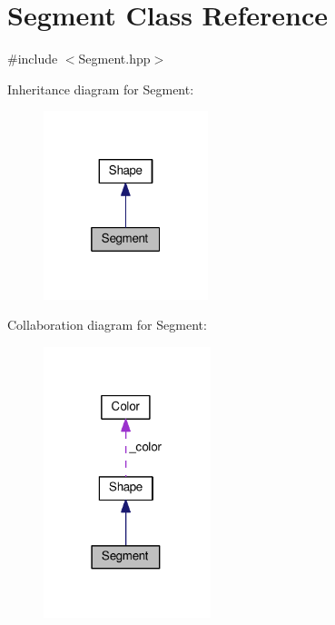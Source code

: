 \hypertarget{class_segment}{}\section{Segment Class Reference}
\label{class_segment}


{\ttfamily \#include $<$Segment.\+hpp$>$}



Inheritance diagram for Segment\+:\nopagebreak
\begin{figure}[H]
\begin{center}
\leavevmode
\includegraphics[width=136pt]{class_segment__inherit__graph}
\end{center}
\end{figure}


Collaboration diagram for Segment\+:\nopagebreak
\begin{figure}[H]
\begin{center}
\leavevmode
\includegraphics[width=138pt]{class_segment__coll__graph}
\end{center}
\end{figure}

